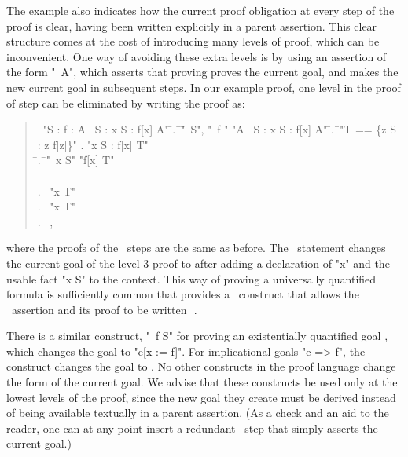 \documentclass[a4paper]{easychair}
\begin{document}
The example also indicates how the current proof obligation at every
step of the proof is clear, having been written explicitly in a parent
assertion.  This clear structure comes at the cost of introducing many
levels of proof, which can be inconvenient.  One way of avoiding these
extra levels is by using an assertion of the form "\SUFFICES\ A",
which asserts that proving  proves the current goal, and makes 
the new current goal in subsequent steps.  In our example proof, one
level in the proof of step  can be eliminated by writing the proof
as:
\begin{quote} \small
  \begin{tabbing}
    \THEOREM\ "\forall S : \forall f \in [S -> \SUBSET\ S] : \exists A \in \SUBSET\ S : \forall x \in S : f[x] \neq A" \kill
    \PROOF \kill
    \LSP \= .\ \= \ASSUME \= "\NEW\ S", \kill
         \>        \>         \> "\NEW\ f \in [S -> \SUBSET\ S]" \kill
         \>        \> \PROVE "\exists A \in \SUBSET\ S : \forall x \in S : f[x] \neq A" \kill
         \>        \> \PROOF \kill
         \> \hspace{1em} \= .\ \= \DEFINE "T == \{z \in S : z \notin f[z]\}" \kill
         \>        \> .  \> "\forall x \in S : f[x] \neq T" \\
         \>        \>  \hspace{1em} \= .\ \= \SUFFICES \ASSUME "\NEW\ x \in S" \PROVE "f[x] \neq T" \\
         \>        \>        \> \hspace{1em} \PROOF \OBVIOUS \\
         \>        \>        \> .\ \> \CASE "x \in T" \\
         \>        \>        \> .\ \> \CASE "x \notin T" \\
         \>        \>        \> .\ \> \QED \BY {}, 
  \end{tabbing}
\end{quote}
where the proofs of the \CASE\ steps are the same as before.  The
\SUFFICES\ statement changes the current goal of the level-3 proof to
 after adding a declaration of "x" and the usable fact "x
\in S" to the context. This way of proving a universally quantified
formula is sufficiently common that \tlatwo provides a \TAKE\
construct that allows the \SUFFICES\ assertion  and its \OBVIOUS
proof to be written \mbox{\,\,}. 

There is a similar construct, "\WITNESS\ f \in S" for proving an
existentially quantified goal , which changes the
goal to "e[x := f]".
For implicational goals "e => f", the construct  changes the
goal to .  No other constructs in the \tlatwo proof language change
the form of the current goal. We advise that these constructs be used
only at the lowest levels of the proof, since the new goal they create
must be derived instead of being available textually in a parent
assertion.  (As a check and an aid to the reader, one can at any point
insert a redundant \SUFFICES\ step that simply asserts the current
goal.)
\end{document}
